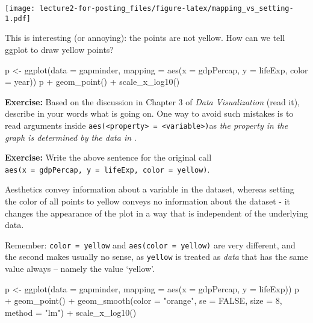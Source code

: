 \documentclass[
]{article}
\newenvironment{Shaded}{\begin{snugshade}}{\end{snugshade}}
\newcommand{\AttributeTok}[1]{\textcolor[rgb]{0.77,0.63,0.00}{#1}}
\newcommand{\ConstantTok}[1]{\textcolor[rgb]{0.00,0.00,0.00}{#1}}
\newcommand{\DecValTok}[1]{\textcolor[rgb]{0.00,0.00,0.81}{#1}}
\newcommand{\FunctionTok}[1]{\textcolor[rgb]{0.00,0.00,0.00}{#1}}
\newcommand{\NormalTok}[1]{#1}
\newcommand{\OtherTok}[1]{\textcolor[rgb]{0.56,0.35,0.01}{#1}}
\newcommand{\SpecialCharTok}[1]{\textcolor[rgb]{0.00,0.00,0.00}{#1}}
\newcommand{\StringTok}[1]{\textcolor[rgb]{0.31,0.60,0.02}{#1}}
\begin{document}
\texttt{[image: lecture2-for-posting\_files/figure-latex/mapping\_vs\_setting-1.pdf]}

This is interesting (or annoying): the points are not yellow. How can we
tell ggplot to draw yellow points?

\begin{Shaded}
\begin{Highlighting}[]
\NormalTok{p }\OtherTok{\textless{}{-}} \FunctionTok{ggplot}\NormalTok{(}\AttributeTok{data =}\NormalTok{ gapminder,}
            \AttributeTok{mapping =} \FunctionTok{aes}\NormalTok{(}\AttributeTok{x =}\NormalTok{ gdpPercap, }\AttributeTok{y =}\NormalTok{ lifeExp, }\AttributeTok{color =}\NormalTok{ year))}
\NormalTok{p }\SpecialCharTok{+} \FunctionTok{geom\_point}\NormalTok{() }\SpecialCharTok{+} \FunctionTok{scale\_x\_log10}\NormalTok{()}
\end{Highlighting}
\end{Shaded}

\textbf{Exercise:} Based on the discussion in Chapter 3 of \emph{Data
Visualization} (read it), describe in your words what is going on. One
way to avoid such mistakes is to read arguments inside
\texttt{aes(\textless{}property\textgreater{}\ =\ \textless{}variable\textgreater{})}as
\emph{the property in the graph is determined by the data in }.

\textbf{Exercise:} Write the above sentence for the original call
\texttt{aes(x\ =\ gdpPercap,\ y\ =\ lifeExp,\ color\ =\ \textquotesingle{}yellow\textquotesingle{})}.

Aesthetics convey information about a variable in the dataset, whereas
setting the color of all points to yellow conveys no information about
the dataset - it changes the appearance of the plot in a way that is
independent of the underlying data.

Remember: \texttt{color\ =\ \textquotesingle{}yellow\textquotesingle{}}
and \texttt{aes(color\ =\ \textquotesingle{}yellow\textquotesingle{})}
are very different, and the second makes usually no sense, as
\texttt{\textquotesingle{}yellow\textquotesingle{}} is treated as
\emph{data} that has the same value always -- namely the value `yellow'.

\begin{Shaded}
\begin{Highlighting}[]
\NormalTok{p }\OtherTok{\textless{}{-}} \FunctionTok{ggplot}\NormalTok{(}\AttributeTok{data =}\NormalTok{ gapminder,}
            \AttributeTok{mapping =} \FunctionTok{aes}\NormalTok{(}\AttributeTok{x =}\NormalTok{ gdpPercap, }\AttributeTok{y =}\NormalTok{ lifeExp))}
\NormalTok{p }\SpecialCharTok{+} \FunctionTok{geom\_point}\NormalTok{() }\SpecialCharTok{+} \FunctionTok{geom\_smooth}\NormalTok{(}\AttributeTok{color =} \StringTok{"orange"}\NormalTok{, }\AttributeTok{se =} \ConstantTok{FALSE}\NormalTok{, }\AttributeTok{size =} \DecValTok{8}\NormalTok{, }\AttributeTok{method =} \StringTok{"lm"}\NormalTok{) }\SpecialCharTok{+} \FunctionTok{scale\_x\_log10}\NormalTok{()}
\end{Highlighting}
\end{Shaded}
\end{document}
